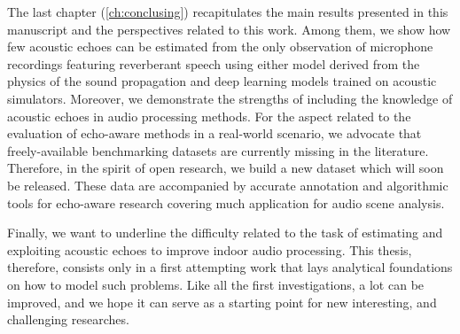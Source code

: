 The last chapter (\cref{ch:conclusing}) recapitulates the main results presented in this manuscript and the perspectives related to this work.
Among them, we show how few acoustic echoes can be estimated from the only observation of microphone recordings featuring reverberant speech using either model derived from the physics of the sound propagation and deep learning models trained on acoustic simulators.
Moreover, we demonstrate the strengths of including the knowledge of acoustic echoes in audio processing methods.
For the aspect related to the evaluation of echo-aware methods in a real-world scenario, we advocate that freely-available benchmarking datasets are currently missing in the literature. Therefore, in the spirit of open research, we build a new dataset which will soon be released. These data are accompanied by accurate annotation and algorithmic tools for echo-aware research covering much application for audio scene analysis.

Finally, we want to underline the difficulty related to the task of estimating and exploiting acoustic echoes to improve indoor audio processing. This thesis, therefore, consists only in a first attempting work that lays analytical foundations on how to model such problems.
Like all the first investigations, a lot can be improved, and we hope it can serve as a starting point for new interesting, and challenging researches.